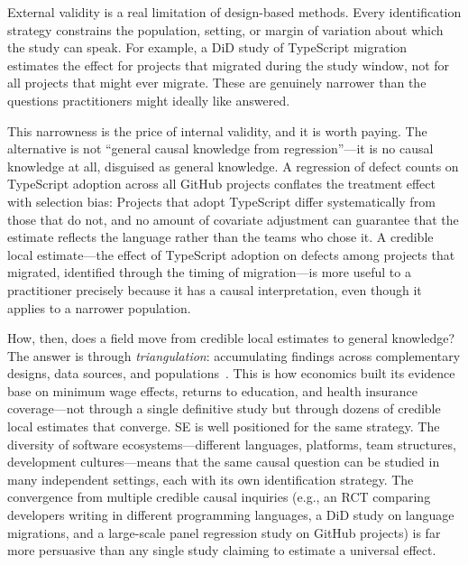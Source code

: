 External validity is a real limitation of design-based methods.
Every identification strategy constrains the population, setting, or margin of variation about which the study can speak.
For example, a DiD study of TypeScript migration estimates the effect for projects that migrated during the study window, not for all projects that might ever migrate.
These are genuinely narrower than the questions practitioners might ideally like answered.

This narrowness is the price of internal validity, and it is worth paying.
The alternative is not ``general causal knowledge from regression''---it is no causal knowledge at all, disguised as general knowledge.
A regression of defect counts on TypeScript adoption across all GitHub projects conflates the treatment effect with selection bias: Projects that adopt TypeScript differ systematically from those that do not, and no amount of covariate adjustment can guarantee that the estimate reflects the language rather than the teams who chose it.
A credible local estimate---the effect of TypeScript adoption on defects among projects that migrated, identified through the timing of migration---is more useful to a practitioner precisely because it has a causal interpretation, even though it applies to a narrower population.

How, then, does a field move from credible local estimates to general knowledge?
The answer is through \emph{triangulation}: accumulating findings across complementary designs, data sources, and populations~\cite{shadish2002experimental}.
This is how economics built its evidence base on minimum wage effects, returns to education, and health insurance coverage---not through a single definitive study but through dozens of credible local estimates that converge.
SE is well positioned for the same strategy.
The diversity of software ecosystems---different languages, platforms, team structures, development cultures---means that the same causal question can be studied in many independent settings, each with its own identification strategy.
The convergence from multiple credible causal inquiries (e.g., an RCT comparing developers writing in different programming languages, a DiD study on language migrations, and a large-scale panel regression study on GitHub projects) is far more persuasive than any single study claiming to estimate a universal effect.


